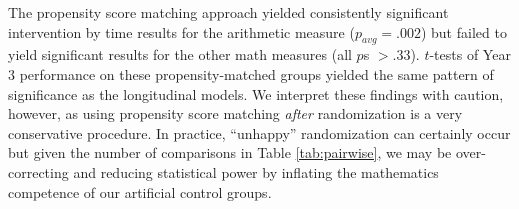 \documentclass[11pt]{article}
\begin{document}
The propensity score matching approach yielded consistently significant intervention by time results for the arithmetic measure ($p_{avg} = .002$) but failed to yield significant results for the other math measures (all $p$s $>.33$). $t$-tests of Year 3 performance on these propensity-matched groups yielded the same pattern of significance as the longitudinal models. We interpret these findings with caution, however, as using propensity score matching \emph{after} randomization is a very conservative procedure. In practice, ``unhappy'' randomization can certainly occur but given the number of comparisons in Table \ref{tab:pairwise}, we may be over-correcting and reducing statistical power by inflating the mathematics competence of our artificial control groups.

\newpage


 
\end{document}
